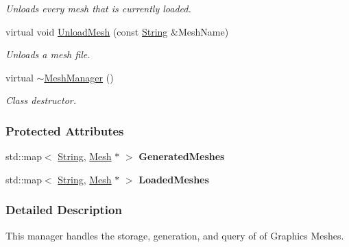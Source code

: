 \begin{DoxyCompactItemize}
\begin{DoxyCompactList}\small\item\em Unloads every mesh that is currently loaded. \item\end{DoxyCompactList}\item 
virtual void \hyperlink{classMezzanine_1_1MeshManager_aa8bf0e0aad71969dd4076cd36e2e8ab3}{UnloadMesh} (const \hyperlink{namespaceMezzanine_acf9fcc130e6ebf08e3d8491aebcf1c86}{String} \&MeshName)
\begin{DoxyCompactList}\small\item\em Unloads a mesh file. \item\end{DoxyCompactList}\item 
\hypertarget{classMezzanine_1_1MeshManager_a5022cb5a023a4ec75ca47ea722ecdad1}{
virtual \hyperlink{classMezzanine_1_1MeshManager_a5022cb5a023a4ec75ca47ea722ecdad1}{$\sim$MeshManager} ()}
\label{classMezzanine_1_1MeshManager_a5022cb5a023a4ec75ca47ea722ecdad1}

\begin{DoxyCompactList}\small\item\em Class destructor. \item\end{DoxyCompactList}\end{DoxyCompactItemize}
\subsubsection*{Protected Attributes}
\begin{DoxyCompactItemize}
\item 
\hypertarget{classMezzanine_1_1MeshManager_a8ebad0c5129a136f49fd11ec68dba8c8}{
std::map$<$ \hyperlink{namespaceMezzanine_acf9fcc130e6ebf08e3d8491aebcf1c86}{String}, \hyperlink{classMezzanine_1_1Mesh}{Mesh} $\ast$ $>$ {\bfseries GeneratedMeshes}}
\label{classMezzanine_1_1MeshManager_a8ebad0c5129a136f49fd11ec68dba8c8}

\item 
\hypertarget{classMezzanine_1_1MeshManager_a6baa9cd1ab36436745ab74955157bfda}{
std::map$<$ \hyperlink{namespaceMezzanine_acf9fcc130e6ebf08e3d8491aebcf1c86}{String}, \hyperlink{classMezzanine_1_1Mesh}{Mesh} $\ast$ $>$ {\bfseries LoadedMeshes}}
\label{classMezzanine_1_1MeshManager_a6baa9cd1ab36436745ab74955157bfda}

\end{DoxyCompactItemize}


\subsubsection{Detailed Description}
This manager handles the storage, generation, and query of of Graphics Meshes. 

